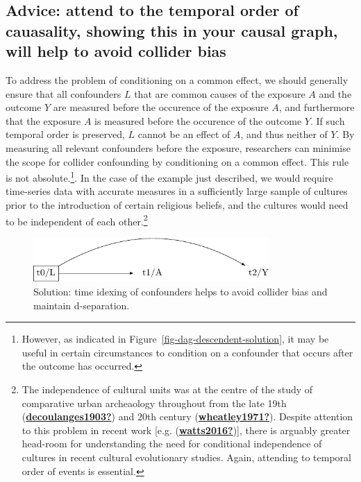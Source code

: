 \documentclass[
  singlecolumn]{report}
\begin{document}
\hypertarget{advice-attend-to-the-temporal-order-of-cauasality-showing-this-in-your-causal-graph-will-help-to-avoid-collider-bias}{%
\subsection{Advice: attend to the temporal order of cauasality, showing
this in your causal graph, will help to avoid collider
bias}\label{advice-attend-to-the-temporal-order-of-cauasality-showing-this-in-your-causal-graph-will-help-to-avoid-collider-bias}}

To address the problem of conditioning on a common effect, we should
generally ensure that all confounders \(L\) that are common causes of
the exposure \(A\) and the outcome \(Y\) are measured before the
occurence of the exposure \(A\), and furthermore that the exposure \(A\)
is measured before the occurence of the outcome \(Y\). If such temporal
order is preserved, \(L\) cannot be an effect of \(A\), and thus neither
of \(Y\). By measuring all relevant confounders before the exposure,
researchers can minimise the scope for collider confounding by
conditioning on a common effect. This rule is not absolute.\footnote{However,
  as indicated in Figure~\ref{fig-dag-descendent-solution}, it may be
  useful in certain circumstances to condition on a confounder that
  occurs after the outcome has occurred.}. In the case of the example
just described, we would require time-series data with accurate measures
in a sufficiently large sample of cultures prior to the introduction of
certain religious beliefs, and the cultures would need to be independent
of each other.\footnote{The independence of cultural units was at the
  centre of the study of comparative urban archeaology throughout from
  the late 19th
  (\protect\hyperlink{ref-decoulanges1903}{\textbf{decoulanges1903?}})
  and 20th century
  (\protect\hyperlink{ref-wheatley1971}{\textbf{wheatley1971?}}).
  Despite attention to this problem in recent work {[}e.g.
  (\protect\hyperlink{ref-watts2016}{\textbf{watts2016?}}){]}, there is
  arguably greater head-room for understanding the need for conditional
  independence of cultures in recent cultural evolutionary studies.
  Again, attending to temporal order of events is essential.}

\begin{figure}

{\centering \includegraphics[width=0.8\textwidth,height=\textheight]{causal-dags_files/figure-pdf/fig-dag-common-effect-solution-1.pdf}

}

\caption{\label{fig-dag-common-effect-solution}Solution: time idexing of
confounders helps to avoid collider bias and maintain d-separation.}

\end{figure}
\end{document}
